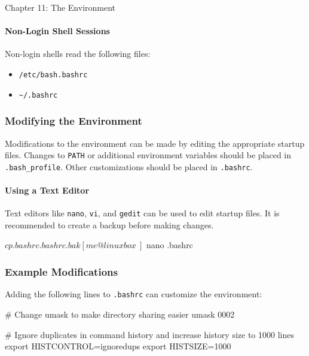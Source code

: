 \begin{notes}{Chapter 11: The Environment}
    \paragraph*{Non-Login Shell Sessions}

    Non-login shells read the following files:
    \begin{itemize}
        \item \texttt{/etc/bash.bashrc}
        \item \texttt{\~{}/.bashrc}
    \end{itemize}

    \subsubsection*{Modifying the Environment}

    Modifications to the environment can be made by editing the appropriate startup files. Changes to \texttt{PATH} or additional environment variables should be placed in \texttt{.bash\_profile}. 
    Other customizations should be placed in \texttt{.bashrc}.

    \paragraph*{Using a Text Editor}

    Text editors like \texttt{nano}, \texttt{vi}, and \texttt{gedit} can be used to edit startup files. It is recommended to create a backup before making changes.

    \begin{highlight}
    \begin{code}[Pseudo]
    [me@linuxbox ~]$ cp .bashrc .bashrc.bak
    [me@linuxbox ~]$ nano .bashrc
    \end{code}
    \end{highlight}

    \subsubsection*{Example Modifications}

    Adding the following lines to \texttt{.bashrc} can customize the environment:
    \begin{highlight}
    \begin{code}[Pseudo]
    # Change umask to make directory sharing easier
    umask 0002

    # Ignore duplicates in command history and increase history size to 1000 lines
    export HISTCONTROL=ignoredups
    export HISTSIZE=1000


\end{code}
\end{highlight}
\end{notes}
